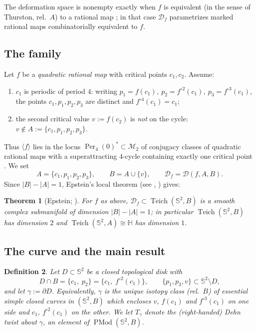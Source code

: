 \documentclass[11pt]{amsart}
\newtheorem{theorem}{Theorem}[section]
\newtheorem{definition}[theorem]{Definition}
\newcommand{\Sph}{\mathbb{S}^{2}}
\newcommand{\Teich}{\operatorname{Teich}}
\newcommand{\PMod}{\operatorname{PMod}}
\newcommand{\Def}{\mathcal{D}}
\begin{document}
The deformation space is nonempty exactly when $f$ is equivalent (in the
sense of Thurston, rel.\ $A$) to a rational map \cite{Epstein,Luo}; in that
case $\Def_f$ parametrizes marked rational maps combinatorially equivalent
to $f$.

\subsection{The family}
Let $f$ be a \emph{quadratic rational map} with critical points $c_1,c_2$.
Assume:
\begin{enumerate}
\item[(H1)] $c_1$ is periodic of period $4$: writing
$p_1=f(c_1),\ p_2=f^{\circ 2}(c_1),\ p_3=f^{\circ 3}(c_1)$, the points
$c_1,p_1,p_2,p_3$ are distinct and $f^{\circ 4}(c_1)=c_1$;
\item[(H2)] the second critical value $v:=f(c_2)$ is \emph{not} on the
cycle: $v\notin A:=\{c_1,p_1,p_2,p_3\}$.
\end{enumerate}
Thus $\langle f\rangle$ lies in the locus $\operatorname{Per}_4(0)^*\subset
\mathcal{M}_2$ of conjugacy classes of quadratic rational maps with a
superattracting $4$-cycle containing exactly one critical point
\cite{Luo}. We set
\[
A=\{c_1,p_1,p_2,p_3\},\qquad B=A\cup\{v\},\qquad \Def_f=\Def(f,A,B).
\]
Since $|B|-|A|=1$, Epstein's local theorem (see \cite{Epstein},
\cite[Thm.~1.2]{Luo}) gives:

\begin{theorem}[{Epstein; \cite[Thm.~1.2]{Luo}}]\label{T:dim}
For $f$ as above, $\Def_f\subset\Teich(\Sph,B)$ is a smooth complex
submanifold of dimension $|B|-|A|=1$; in particular $\Teich(\Sph,B)$ has
dimension $2$ and $\Teich(\Sph,A)\cong\mathbb{H}$ has dimension $1$.
\end{theorem}

\subsection{The curve and the main result}

\begin{definition}\label{D:curve}
Let $D\subset\Sph$ be a closed topological disk with
\[
D\cap B=\{c_1,\;p_2\}=\{c_1,\;f^{\circ 2}(c_1)\},
\qquad
\{p_1,p_3,v\}\subset \Sph\setminus D ,
\]
and let $\gamma:=\partial D$. Equivalently, $\gamma$ is the unique
isotopy class (rel.\ $B$) of essential simple closed curves in $(\Sph,B)$
which encloses $v$, $f(c_1)$ and $f^{\circ 3}(c_1)$ on one side and
$c_1$, $f^{\circ 2}(c_1)$ on the other. We let $T_\gamma$ denote the
(right-handed) Dehn twist about $\gamma$, an element of
$\PMod(\Sph,B)$.
\end{definition}
\end{document}
